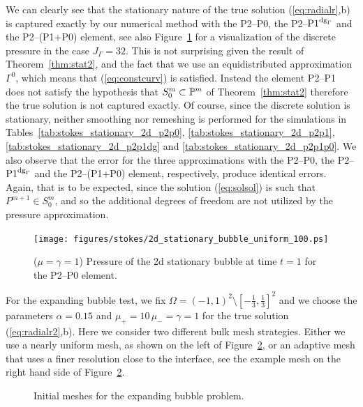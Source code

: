 We can clearly see that the stationary nature of the true solution
(\ref{eq:radialr},b) is captured exactly by our numerical method with the
P2--P0, the P2--${\rm P1}^{{\rm dg}_\Gamma}$ and the P2--(P1+P0) element, see also
Figure~\ref{fig:2d_stationary_bubble} for a visualization of the discrete
pressure in the case $J_\Gamma = 32$. This is not surprising given the
result of Theorem~\ref{thm:stat2}, and the fact that we use an equidistributed
approximation $\Gamma^0$, which means that (\ref{eq:constcurv}) is satisfied.
Instead the element P2--P1 does not satisfy the hypothesis that $S^m_0 \subset
\mathbb{P}^m$ of Theorem~\ref{thm:stat2} therefore the true solution is not
captured exactly. Of course, since the discrete solution is stationary, neither
smoothing nor remeshing is performed for the simulations in
Tables~\ref{tab:stokes_stationary_2d_p2p0},
\ref{tab:stokes_stationary_2d_p2p1}, \ref{tab:stokes_stationary_2d_p2p1dg} and
\ref{tab:stokes_stationary_2d_p2p1p0}. We also observe that the error for the
three approximations with the P2--P0, the P2--${\rm P1}^{{\rm dg}_\Gamma}$ and the P2--(P1+P0)
element, respectively, produce identical errors. Again, that is to be expected,
since the solution (\ref{eq:solsol}) is such that $P^{m+1} \in S^m_0$, and so
the additional degrees of freedom are not utilized by the pressure
approximation.
\begin{figure}[htbp]
\centering
\texttt{[image: figures/stokes/2d\_stationary\_bubble\_uniform\_100.ps]}
\caption[Stokes 2d stationary bubble pressure]
{($\mu=\gamma=1$) Pressure of the 2d stationary bubble at time $t=1$
for the P2--P0 element.}
\label{fig:2d_stationary_bubble}
\end{figure}

For the expanding bubble test, we fix $\Omega = (-1,1)^2 \setminus
[-\frac13,\frac13]^2$ and we choose the parameters $\alpha = 0.15$ and $\mu_+ =
10\,\mu_- = \gamma = 1$ for the true solution (\ref{eq:radialr2},b). Here we
consider two different bulk mesh strategies. Either we use a nearly uniform
mesh, as shown on the left of Figure~\ref{fig:meshes_expanding}, or an adaptive
mesh that uses a finer resolution close to the interface, see the example mesh
on the right hand side of Figure~\ref{fig:meshes_expanding}.
\begin{figure}[htbp]
\centering
{}
\caption[Stokes 2d expanding bubble initial meshes]
{Initial meshes for the expanding bubble problem.}
\label{fig:meshes_expanding}
\end{figure}

